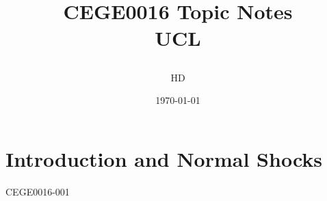 \documentclass[12pt,a4paper, twoside]{report}
\begin{document}
\title{
{CEGE0016 Topic Notes}\\
{\large UCL}
\author{HD}
\date{\today}
}
\maketitle
\tableofcontents
\chapter{Introduction and Normal Shocks}
{CEGE0016-001}
\end{document}
